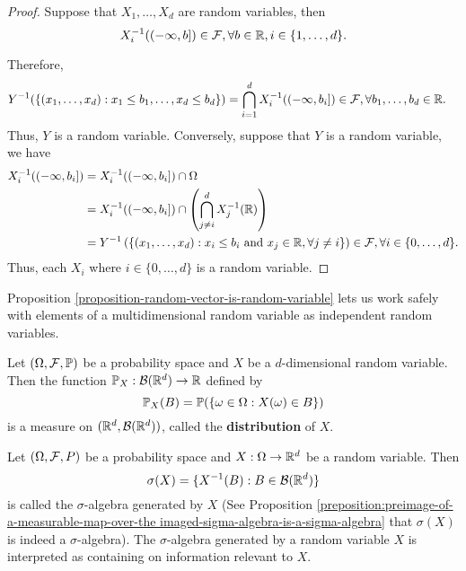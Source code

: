 \begin{proof}
  Suppose that $X_1,\ldots,X_d$ are random variables, then
  $$X_i^{-1}((-\infty, b])\in \mathcal{F}, \forall b\in \mathbb{R}, i\in \{1,\ldots,d\}.$$

  Therefore,
  \begin{align*}
    Y^{-1}(\{(x_1,\ldots,x_d): x_1\le b_1,\ldots, x_d\le b_d\})
     & = \bigcap\limits_{i=1}^d X_i^{-1}((-\infty, b_i]) \in \mathcal{F}, \forall b_1,\ldots,b_d\in \mathbb{R}.
  \end{align*}
  Thus, $Y$ is a random variable. Conversely, suppose that $Y$ is a random variable, we have
  \begin{align*}
    X_i^{-1}((-\infty, b_i])
     & = X_i^{-1}((-\infty, b_i]) \cap \Omega                                                                                                 \\
     & = X_i^{-1}((-\infty, b_i]) \cap \left(\bigcap\limits_{j\ne i}^d X_j^{-1}(\mathbb{R})\right)                                                   \\
     & = Y^{-1}\left(\{(x_1,\ldots, x_d) : x_i \le b_i \text{ and } x_j \in \mathbb{R}, \forall j\ne i\}\right) \in \mathcal{F}, \forall i\in\{0,\ldots, d\}.
  \end{align*}
  Thus, each $X_i$ where $i\in\{0,\ldots, d\}$ is a random variable.
\end{proof}

Proposition \ref{proposition-random-vector-is-random-variable} lets us work safely with elements of a multidimensional random variable as independent random variables.

\begin{proposition}
  Let $(\Omega,\mathcal{F},\mathbb{P})$ be a probability space and $X$ be a $d$-dimensional random variable. Then the function $\mathbb{P}_X: \mathcal{B}(\mathbb{R}^d)\to\mathbb{R}$ defined by
  \begin{equation}
    \mathbb{P}_X(B) = \mathbb{P}(\{\omega\in\Omega : X(\omega)\in B\})
  \end{equation}
  is a measure on $(\mathbb{R}^d,\mathcal{B}(\mathbb{R}^d))$, called the \textbf{distribution} of $X$.
\end{proposition}


\begin{definition}
  Let $(\Omega, \mathcal{F}, P)$ be a probability space and $X:\Omega\to\mathbb{R}^d$ be a random variable. Then
  $$\sigma(X)=\{X^{-1}(B) : B\in \mathcal{B}(\mathbb{R}^d)\}$$
  is called the $\sigma$-algebra generated by $X$ (See Proposition \ref{preposition:preimage-of-a-measurable-map-over-the imaged-sigma-algebra-is-a-sigma-algebra} that $\sigma(X)$ is indeed a $\sigma$-algebra). The $\sigma$-algebra generated by a random variable $X$ is interpreted as containing on information relevant to $X$.
\end{definition}

